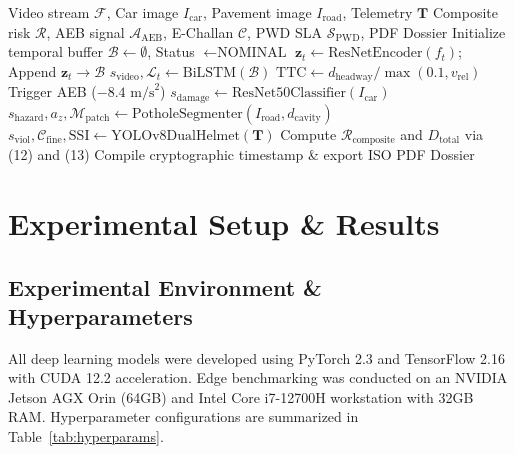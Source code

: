\documentclass[journal,compsoc]{IEEEtran}
\begin{document}
\begin{algorithm}[H]
\caption{Multimodal Pre-Crash \& Damage Triage Execution}
\label{alg:multimodal_triage}
\begin{algorithmic}[1]
\REQUIRE Video stream $\mathcal{F}$, Car image $I_{\text{car}}$, Pavement image $I_{\text{road}}$, Telemetry $\mathbf{T}$
\ENSURE Composite risk $\mathcal{R}$, AEB signal $\mathcal{A}_{\text{AEB}}$, E-Challan $\mathcal{C}$, PWD SLA $\mathcal{S}_{\text{PWD}}$, PDF Dossier
\STATE Initialize temporal buffer $\mathcal{B} \leftarrow \emptyset$, Status $\leftarrow \text{NOMINAL}$
    \STATE $\mathbf{z}_t \leftarrow \text{ResNetEncoder}(f_t)$; Append $\mathbf{z}_t \rightarrow \mathcal{B}$
        \STATE $s_{\text{video}}, \mathcal{L}_t \leftarrow \text{BiLSTM}(\mathcal{B})$
        \STATE $\text{TTC} \leftarrow d_{\text{headway}} / \max(0.1, v_{\text{rel}})$
            \STATE Trigger AEB ($-8.4\text{ m/s}^2$)
        \ENDIF
    \ENDIF
\ENDFOR
\STATE $s_{\text{damage}} \leftarrow \text{ResNet50Classifier}(I_{\text{car}})$
\STATE $s_{\text{hazard}}, a_z, \mathcal{M}_{\text{patch}} \leftarrow \text{PotholeSegmenter}(I_{\text{road}}, d_{\text{cavity}})$
\STATE $s_{\text{viol}}, \mathcal{C}_{\text{fine}}, \text{SSI} \leftarrow \text{YOLOv8DualHelmet}(\mathbf{T})$
\STATE Compute $\mathcal{R}_{\text{composite}}$ and $D_{\text{total}}$ via (12) and (13)
\STATE Compile cryptographic timestamp \& export ISO PDF Dossier
\end{algorithmic}
\end{algorithm}

\section{Experimental Setup \& Results}

\subsection{Experimental Environment \& Hyperparameters}
All deep learning models were developed using PyTorch 2.3 and TensorFlow 2.16 with CUDA 12.2 acceleration. Edge benchmarking was conducted on an NVIDIA Jetson AGX Orin (64GB) and Intel Core i7-12700H workstation with 32GB RAM. Hyperparameter configurations are summarized in Table~\ref{tab:hyperparams}.
\end{document}
